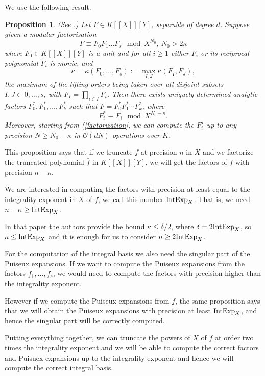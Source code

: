 \documentclass[a4paper,11pt,reqno]{amsart}%
\theoremstyle{definition}
\theoremstyle{plain}
\newtheorem{proposition}[defn]{Proposition}
\theoremstyle{remark}
\newcommand{\bigO}{\mathcal{O}}
\newcommand\ct[1]{\text{\rmfamily\upshape #1}}
\newcommand{\IntExpX}{\ct{IntExp}_X}
\begin{document}
We use the following result.

\begin{proposition}\label{prop:factors}(See \cite[Proposition 23]{poteaux2021}.)
Let $F \in K[[X]][Y]$, separable of degree $d$. Suppose given a modular factorisation
\begin{equation}\label{factorization}
F \equiv  F_0 F_1 \dots F_s \mod X^{N_0}, \ N_0 > 2\kappa
\end{equation}
where $F_0 \in K[[X]][Y]$ is a unit and for all $i \ge 1$ either $F_i$ or its reciprocal polynomial $\tilde F_i$ is monic, and
$$
\kappa = \kappa(F_0,..., F_s) := \max_{I, J} \kappa(F_I, F_J),
$$
the maximum of the lifting orders being taken over all disjoint subsets $I, J \subset {0,\dots,s}$,
with $F_I = \prod_{i\in I} F_i$. Then there exists uniquely determined analytic factors $F_0^*, F_1^*,\dots, F_k^*$ such that $F = F_0^* F_1^* \cdots F_k^*$, where
$$
F_i^* \equiv F_i \mod X^{N_0−\kappa}.
$$
Moreover, starting from (\ref{factorization}, we can compute the $F_i^\star$ up to any precision $N \ge N_0 − \kappa$ in $\bigO(dN)$ operations over $K$.
\end{proposition}

This proposition says that if we truncate $f$ at precision $n$ in $X$ and we factorize the truncated polynomial $\bar f$ in $K[[X]][Y]$, we will get the factors of $f$ with precision $n - \kappa$.

We are interested in computing the factors with precision at least equal to the integrality exponent in $X$ of $f$, we call this number $\IntExpX$. That is, we need
$n - \kappa \ge \IntExpX$.

In that paper the authors provide the bound $\kappa \le \delta / 2$, where $\delta = 2 \IntExpX$, so $\kappa \le \IntExpX$ and it is enough for us to consider $n \ge 2 \IntExpX$.

For the computation of the integral basis we also need the singular part of the Puiseux expansions. If we want to compute the Puiseux expansions from the factors $f_1, \dots, f_s$, we would need to compute the factors with precision higher than the integrality exponent.

However if we compute the Puiseux expansions from $\bar f$, the same proposition says that we will obtain the Puiseux expansions with precision at least $\IntExpX$, and hence the singular part will be correctly computed.

Putting everything together, we can truncate the powers of $X$ of $f$ at order two times the integrality exponent and we will be able to compute the correct factors and Puisuex expansions up to the integrality exponent and hence we will compute the correct integral basis.
\end{document}
